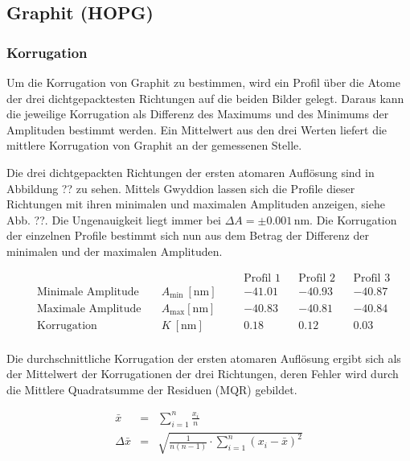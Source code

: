 \documentclass[12pt,a4paper]{scrartcl}
\numberwithin{equation}{section} %
\begin{document}
\hypertarget{graphit-hopg}{%
\subsection{Graphit (HOPG)}\label{graphit-hopg}}

\hypertarget{korrugation}{%
\subsubsection{Korrugation}\label{korrugation}}

Um die Korrugation von Graphit zu bestimmen, wird ein Profil über die
Atome der drei dichtgepacktesten Richtungen auf die beiden Bilder
gelegt. Daraus kann die jeweilige Korrugation als Differenz des Maximums
und des Minimums der Amplituden bestimmt werden. Ein Mittelwert aus den
drei Werten liefert die mittlere Korrugation von Graphit an der
gemessenen Stelle.

Die drei dichtgepackten Richtungen der ersten atomaren Auflösung sind in
Abbildung ?? zu sehen. Mittels Gwyddion \cite{Gwyddion} lassen sich die Profile
dieser Richtungen mit ihren minimalen und maximalen Amplituden anzeigen,
siehe Abb. ??. Die Ungenauigkeit liegt immer bei
$\Delta A = \pm 0.001 \mathrm{\,nm}$. Die Korrugation der einzelnen
Profile bestimmt sich nun aus dem Betrag der Differenz der minimalen und
der maximalen Amplituden.

\begin{align*}
    &&&&& \text{Profil 1}&& \text{Profil 2} && \text{Profil 3} \\
    &\text{Minimale Amplitude}\quad &A_\mathrm{min}\ [\mathrm{nm}] &&
        & -41.01 && -40.93 && -40.87 \\
    &\text{Maximale Amplitude}\quad &A_\mathrm{max} [\mathrm{nm}] &&
        & -40.83 && -40.81 && -40.84 \\
    &\text{Korrugation} &K\ [\mathrm{nm}] &&
        & 0.18 && 0.12 && 0.03 \\
\end{align*}

Die durchschnittliche Korrugation der ersten atomaren Auflösung ergibt
sich als der Mittelwert der Korrugationen der drei Richtungen, deren
Fehler wird durch die Mittlere Quadratsumme der Residuen (MQR) gebildet.

\begin{eqnarray}
    \bar{x} &=& \sum_{i=1}^n \frac{x_i}{n} \\
    \Delta \bar{x} &=& \sqrt{\frac{1}{n (n-1)} \cdot \sum_{i=1}^{n} (x_i -\bar{x})^2}
\end{eqnarray}
\end{document}
